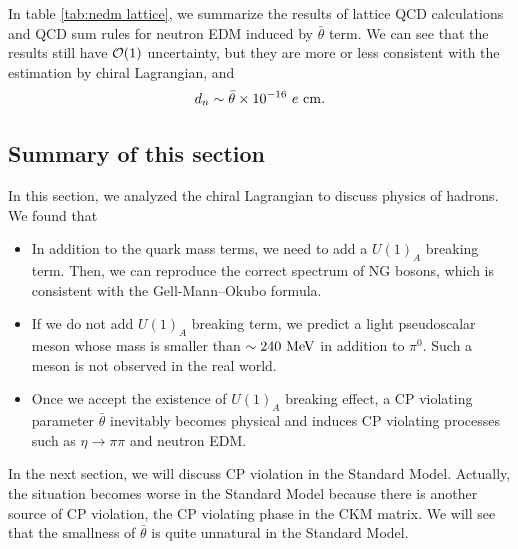 \documentclass[11pt,a4paper]{article}
\begin{document}
In table \ref{tab:nedm lattice}, we summarize the results of lattice QCD calculations and QCD sum rules for neutron EDM induced by $\bar\theta$ term. We can see that the results still have ${\cal O}(1)$ uncertainty, but they are more or less consistent with the estimation by chiral Lagrangian, and
\begin{align}
    d_n \sim \bar\theta \times 10^{-16}~e~{\rm cm}.
\end{align}

\subsection{Summary of this section}
In this section, we analyzed the chiral Lagrangian to discuss physics of hadrons. We found that
\begin{itemize}
    \item In addition to the quark mass terms, we need to add a $U(1)_A$ breaking term. Then, we can reproduce the correct spectrum of NG bosons, which is consistent with the Gell-Mann--Okubo formula.
    \item If we do not add $U(1)_A$ breaking term, we predict a light pseudoscalar meson whose mass is smaller than $\sim 240~{\rm MeV}$ in addition to $\pi^0$. Such a meson is not observed in the real world.
    \item Once we accept the existence of $U(1)_A$ breaking effect, a CP violating parameter $\bar\theta$ inevitably becomes physical and induces CP violating processes such as $\eta \to \pi\pi$ and neutron EDM.
\end{itemize}
In the next section, we will discuss CP violation in the Standard Model. Actually, the situation becomes worse in the Standard Model because there is another source of CP violation, the CP violating phase in the CKM matrix. We will see that the smallness of $\bar\theta$ is quite unnatural in the Standard Model.


\end{document}
